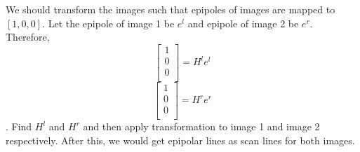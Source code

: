 \documentclass{exam}[14pt]
\begin{document}
\newline \newline 
We should transform the images such that epipoles of images are mapped to $[1,0,0]$. 
\newline \newline
Let the epipole of image 1 be $e^l$ and epipole of image 2 be $e^r$.
\newline\newline
Therefore,
\[
\begin{bmatrix}
    1\\
    0\\ 
    0\\
\end{bmatrix}
=  H^l e^l
\]
\[
\begin{bmatrix}
    1\\
    0\\ 
    0\\
\end{bmatrix}
=  H^r e^r
\].
\newline\newline
Find $H^l$ and $H^r$ and then apply transformation to image 1 and image 2 respectively. 
\newline
After this, we would get epipolar lines as scan lines for both images. 
\end{document}
